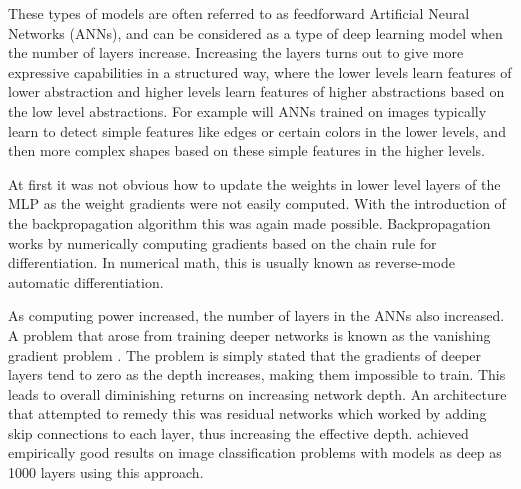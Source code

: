 \documentclass[12pt,a4paper]{book}
\begin{document}

These types of models are often referred to as feedforward Artificial Neural Networks (ANNs), and can be considered as a type of deep learning model when the number of layers increase. Increasing the layers turns out to give more expressive capabilities in a structured way, where the lower levels learn features of lower abstraction and higher levels learn features of higher abstractions based on the low level abstractions. For example will ANNs trained on images typically learn to detect simple features like edges or certain colors in the lower levels, and then more complex shapes based on these simple features in the higher levels.

At first it was not obvious how to update the weights in lower level layers of the MLP as the weight gradients were not easily computed. With the introduction of the backpropagation algorithm \citep{backprop86} this was again made possible. Backpropagation works by numerically computing gradients based on the chain rule for differentiation. In numerical math, this is usually known as reverse-mode automatic differentiation.

As computing power increased, the number of layers in the ANNs also increased. A problem that arose from training deeper networks is known as the vanishing gradient problem \citep{vanishinggradients}. The problem is simply stated that the gradients of deeper layers tend to zero as the depth increases, making them impossible to train. This leads to overall diminishing returns on increasing network depth. An architecture that attempted to remedy this was residual networks \citep{resnet} which worked by adding skip connections to each layer, thus increasing the effective depth. \cite{resnet} achieved empirically good results on image classification problems with models as deep as 1000 layers using this approach.

\end{document}
